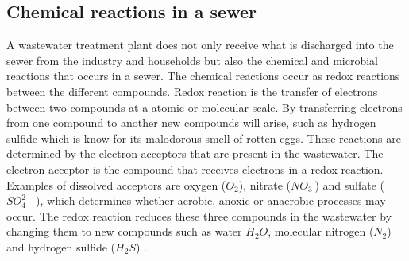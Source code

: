 \subsection{Chemical reactions in a sewer}\label{subse:chemical_reactions_in_a_sewer}
A wastewater treatment plant does not only receive what is discharged into the sewer from the industry and households but also the chemical and microbial reactions that occurs in a sewer. The chemical reactions occur as redox reactions between the different compounds. Redox reaction is the transfer of electrons between two compounds at a atomic or molecular scale. By transferring electrons from one compound to another new compounds will arise, such as hydrogen sulfide which is know for its malodorous smell of rotten eggs. These reactions are determined by the electron acceptors that are present in the wastewater. The electron acceptor is the compound that receives electrons in a redox reaction. Examples of dissolved acceptors are oxygen ($O_2$), nitrate ($NO^-_3$) and sulfate ($SO^{2-}_4$), which determines whether aerobic, anoxic or anaerobic processes may occur. The redox reaction reduces these three compounds in the wastewater by changing them to new compounds such as water $H_2O$, molecular nitrogen ($N_2$) and hydrogen sulfide ($H_2S$) \cite{Sewer_processes}. 

